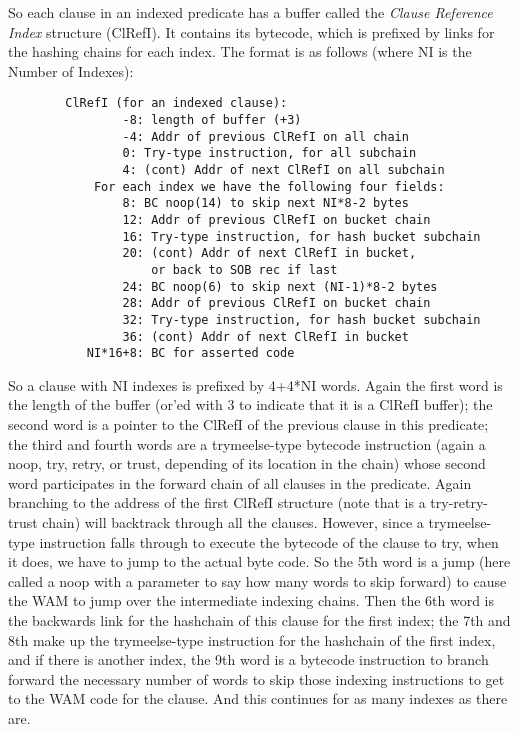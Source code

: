 \documentclass[11pt]{article}
\begin{document}
So each clause in an indexed predicate has a buffer called the {\em
Clause Reference Index} structure (ClRefI).  It contains its bytecode,
which is prefixed by links for the hashing chains for each index.  The
format is as follows (where NI is the Number of Indexes):
\begin{verbatim}
        ClRefI (for an indexed clause):
                -8: length of buffer (+3)
                -4: Addr of previous ClRefI on all chain
                0: Try-type instruction, for all subchain
                4: (cont) Addr of next ClRefI on all subchain
            For each index we have the following four fields: 
                8: BC noop(14) to skip next NI*8-2 bytes
                12: Addr of previous ClRefI on bucket chain
                16: Try-type instruction, for hash bucket subchain
                20: (cont) Addr of next ClRefI in bucket,
                    or back to SOB rec if last
                24: BC noop(6) to skip next (NI-1)*8-2 bytes
                28: Addr of previous ClRefI on bucket chain
                32: Try-type instruction, for hash bucket subchain
                36: (cont) Addr of next ClRefI in bucket
           NI*16+8: BC for asserted code
\end{verbatim}

So a clause with NI indexes is prefixed by 4+4*NI words.  Again the
first word is the length of the buffer (or'ed with 3 to indicate that
it is a ClRefI buffer); the second word is a pointer to the ClRefI of
the previous clause in this predicate; the third and fourth words are
a trymeelse-type bytecode instruction (again a noop, try, retry, or
trust, depending of its location in the chain) whose second word
participates in the forward chain of all clauses in the predicate.
Again branching to the address of the first ClRefI structure (note
that is a try-retry-trust chain) will backtrack through all the
clauses.  However, since a trymeelse-type instruction falls through to
execute the bytecode of the clause to try, when it does, we have to
jump to the actual byte code.  So the 5th word is a jump (here called
a noop with a parameter to say how many words to skip forward) to
cause the WAM to jump over the intermediate indexing chains.  Then the
6th word is the backwards link for the hashchain of this clause for
the first index; the 7th and 8th make up the trymeelse-type
instruction for the hashchain of the first index, and if there is
another index, the 9th word is a bytecode instruction to branch
forward the necessary number of words to skip those indexing
instructions to get to the WAM code for the clause.  And this
continues for as many indexes as there are.
\end{document}
